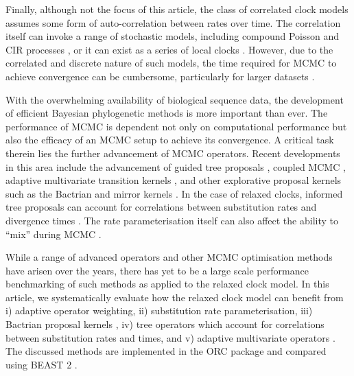 \documentclass[10pt,letterpaper]{article}
\begin{document}
Finally, although not the focus of this article, the class of correlated clock models assumes some form of auto-correlation between rates over time. 
The correlation itself can invoke a range of stochastic models, including compound Poisson \cite{huelsenbeck2000compound} and CIR processes \cite{lepage2007general}, or it can exist as a series of local clocks \cite{drummond2010bayesian}. 
However, due to the correlated and discrete nature of such models, the time required for MCMC to achieve convergence can be cumbersome, particularly for larger datasets \cite{drummond2010bayesian}.  



With the overwhelming availability of biological sequence data, the development of efficient Bayesian phylogenetic methods is more important than ever. 
The performance of MCMC is dependent not only on computational performance but also the efficacy of an
MCMC setup to achieve its convergence.
A critical task therein lies the further advancement of MCMC operators.
Recent developments in this area include the advancement of guided tree proposals \cite{zhang2020using, meyer2019adaptive, hohna2012guided}, coupled MCMC \cite{altekar2004parallel, muller2019coupled},
adaptive multivariate transition kernels \cite{baele2017adaptive},
and other explorative proposal kernels such as the Bactrian and mirror kernels \cite{yang2013searching, thawornwattana2018designing}.
In the case of relaxed clocks, informed tree proposals can account for correlations between substitution rates and divergence times \cite{zhang2020improving}. 
The rate parameterisation itself can also affect the ability to ``mix'' during MCMC \cite{drummond2006relaxed, li2012model, zhang2020improving}. 




While a range of advanced operators and other MCMC optimisation methods have arisen over the years, there has yet to be a large scale performance benchmarking of such methods as applied to the relaxed clock model. 
In this article, we systematically evaluate how the relaxed clock model can benefit from i) adaptive operator weighting, ii) substitution rate parameterisation,  iii) Bactrian proposal kernels \cite{yang2013searching}, iv) tree operators which account for correlations between substitution rates and times, and v) adaptive multivariate operators \cite{baele2017adaptive}.
The discussed methods are implemented in the ORC package and compared using BEAST 2 \cite{bouckaert2019beast}.

\end{document}
